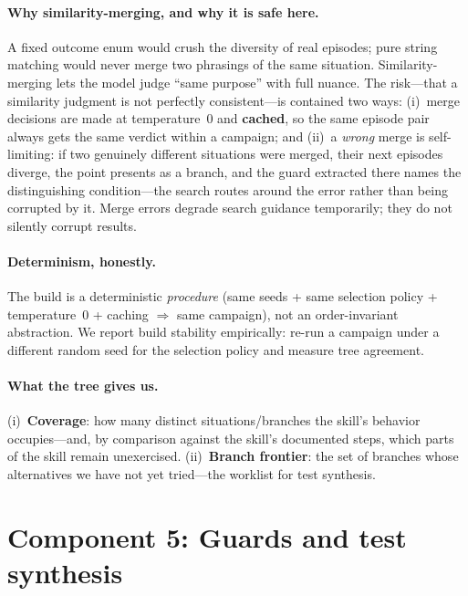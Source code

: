 \documentclass[11pt]{article}
\begin{document}
\paragraph{Why similarity-merging, and why it is safe here.} A fixed outcome enum
would crush the diversity of real episodes; pure string matching would never
merge two phrasings of the same situation. Similarity-merging lets the model
judge ``same purpose'' with full nuance. The risk---that a similarity judgment
is not perfectly consistent---is contained two ways: (i)~merge decisions are made
at temperature~0 and \textbf{cached}, so the same episode pair always gets the
same verdict within a campaign; and (ii)~a \emph{wrong} merge is self-limiting:
if two genuinely different situations were merged, their next episodes diverge,
the point presents as a branch, and the guard extracted there names the
distinguishing condition---the search routes around the error rather than being
corrupted by it. Merge errors degrade search guidance temporarily; they do not
silently corrupt results.

\paragraph{Determinism, honestly.} The build is a deterministic \emph{procedure}
(same seeds + same selection policy + temperature~0 + caching $\Rightarrow$ same
campaign), not an order-invariant abstraction. We report build stability
empirically: re-run a campaign under a different random seed for the selection
policy and measure tree agreement.

\paragraph{What the tree gives us.} (i)~\textbf{Coverage}: how many distinct
situations/branches the skill's behavior occupies---and, by comparison against
the skill's documented steps, which parts of the skill remain unexercised.
(ii)~\textbf{Branch frontier}: the set of branches whose alternatives we have not
yet tried---the worklist for test synthesis.

\section{Component 5: Guards and test synthesis}
\label{sec:guards}
\end{document}
